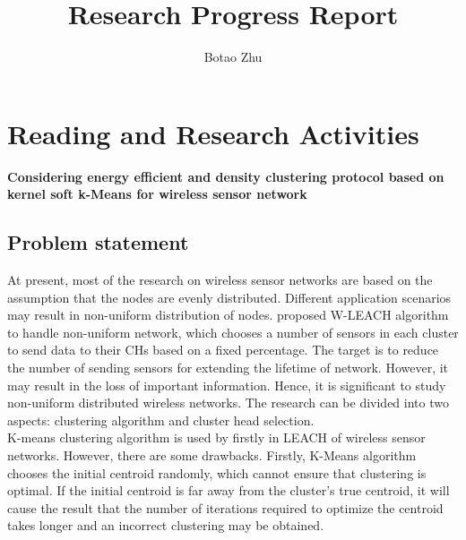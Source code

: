 \documentclass[11pt]{report}
\title{Research Progress Report}
\author{Botao Zhu}
\begin{document}
	
	\maketitle
	 \chead{} 
	 \cfoot{} 
	\renewcommand{\footrulewidth}{1.0pt}
	\renewcommand{\headrulewidth}{2.0pt}
	\renewcommand{\arraystretch}{1.3}
	\pagestyle{fancy}
	
	\renewcommand{\thesection}{\arabic{section}}
	
	\section{Reading and Research Activities}
 
	


	\textbf{Considering energy efficient and density clustering protocol based on kernel soft k-Means for wireless sensor network}
	
    
	
	\subsection{Problem statement}
	At present, most of the research on wireless sensor networks are based on the assumption that the nodes are evenly distributed. Different application scenarios may result in non-uniform distribution of nodes. \cite{5693275} \cite{doi:10.1155/2013/289527} proposed W-LEACH algorithm to handle non-uniform network, which chooses a number of sensors in each cluster to send data to their CHs based on a fixed percentage. The target is to reduce the number of sending sensors for extending the lifetime of network. However, it may result in the loss of important information. Hence, it is significant to study non-uniform distributed wireless networks. The research can be divided into two aspects: clustering algorithm and cluster head selection.\\
	
	\noindent K-means clustering algorithm is used by \cite{6375088} firstly in LEACH of wireless sensor networks. However, there are some drawbacks. Firstly, K-Means algorithm chooses the initial centroid randomly, which cannot ensure that clustering is optimal. If the initial centroid is far away from the cluster's true centroid, it will cause the result that the number of iterations required to optimize the centroid takes longer and an incorrect clustering may be obtained. \\
	
\end{document}
